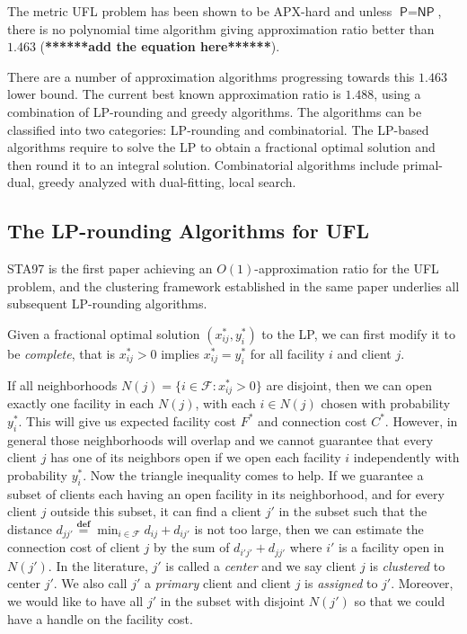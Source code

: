 \documentclass{article}
\newcommand{\fac}{\mathcal{F}}
\newcommand{\PP}{\textsf{P}}
\newcommand{\NP}{\textsf{NP}}
\newcommand{\suchthat}{:}
\newcommand{\defeq}{\stackrel{\textbf{def}}{=}}
\begin{document}
The metric UFL problem has been shown to be APX-hard and unless $\PP =
\NP$, there is no polynomial time algorithm giving approximation ratio
better than $1.463$ (\textbf{******add the equation here******}).

There are a number of approximation algorithms progressing towards
this $1.463$ lower bound. The current best known approximation ratio
is $1.488$, using a combination of LP-rounding and greedy algorithms.
The algorithms can be classified into two categories: LP-rounding and
combinatorial. The LP-based algorithms require to solve the LP to
obtain a fractional optimal solution and then round it to an integral
solution. Combinatorial algorithms include primal-dual, greedy
analyzed with dual-fitting, local search.

\subsection{The LP-rounding Algorithms for UFL}
STA97 is the first paper achieving an $O(1)$-approximation ratio for
the UFL problem, and the clustering framework established in the same
paper underlies all subsequent LP-rounding algorithms.

Given a fractional optimal solution $(x_{ij}^\ast, y_i^\ast)$ to the
LP, we can first modify it to be \emph{complete}, that is
$x_{ij}^\ast>0$ implies $x_{ij}^\ast = y_i^\ast$ for all facility $i$
and client $j$.  

If all neighborhoods $N(j) = \{i\in\fac \suchthat x_{ij}^\ast > 0\}$
are disjoint, then we can open exactly one facility in each $N(j)$,
with each $i\in N(j)$ chosen with probability $y_i^\ast$. This will
give us expected facility cost $F^\ast$ and connection cost $C^\ast$.
However, in general those neighborhoods will overlap and we cannot
guarantee that every client $j$ has one of its neighbors open if we
open each facility $i$ independently with probability $y_i^\ast$. Now
the triangle inequality comes to help. If we guarantee a subset of
clients each having an open facility in its neighborhood, and for
every client $j$ outside this subset, it can find a client $j'$ in the
subset such that the distance $d_{j j'} \defeq \min_{i\in\fac} d_{ij}
+ d_{ij'}$ is not too large, then we can estimate the connection cost
of client $j$ by the sum of $d_{i' j'} + d_{j j'}$ where $i'$ is a
facility open in $N(j')$. In the literature, $j'$ is called a
\emph{center} and we say client $j$ is \emph{clustered} to center
$j'$. We also call $j'$ a \emph{primary} client and client $j$ is
\emph{assigned} to $j'$. Moreover, we would like to have all $j'$ in
the subset with disjoint $N(j')$ so that we could have a handle on the
facility cost.
\end{document}
